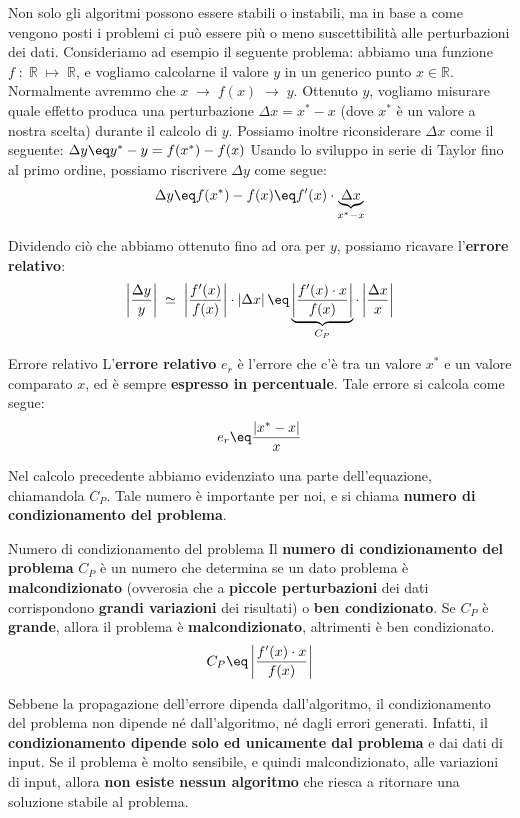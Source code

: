 Non solo gli algoritmi possono essere stabili o instabili, ma in base a come vengono posti i problemi ci può essere più o meno suscettibilità alle perturbazioni dei dati. Consideriamo ad esempio il seguente problema: abbiamo una funzione $f \; : \; \mathbb{R} \; \mapsto \; \mathbb{R}$, e vogliamo calcolarne il valore $y$ in un generico punto $x \in \mathbb{R}$. Normalmente avremmo che $x \; \rightarrow \; f(x) \; \rightarrow \; y$.
\nl
Ottenuto $y$, vogliamo misurare quale effetto produca una perturbazione $\Delta x = x^* - x$ (dove $x^*$ è un valore a nostra scelta) durante il calcolo di $y$. Possiamo inoltre riconsiderare $\Delta x$ come il seguente: $\Delta y \eq y^* - y = f(x^*) - f(x)$
\nl
Usando lo sviluppo in serie di Taylor fino al primo ordine, possiamo riscrivere $\Delta y$ come segue:
\[ \Delta y \eq f(x^*) - f(x) \eq f'(x) \cdot \underbrace{\Delta x}_{x^* - x} \]

Dividendo ciò che abbiamo ottenuto fino ad ora per $y$, possiamo ricavare l'\textbf{errore relativo}:
\[ \left| \frac{\Delta y}{y} \right| \; \simeq \; \left| \frac{f'(x)}{f(x)} \right| \cdot \left|\Delta x\right| \eq \underbrace{\left| \frac{f'(x) \cdot x}{f(x)} \right|}_{C_P} \cdot \left|\frac{\Delta x}{x}\right| \]

\begin{definition}{Errore relativo}
    L'\textbf{errore relativo} $e_r$ è l'errore che c'è tra un valore $x^*$ e un valore comparato $x$, ed è sempre \textbf{espresso in percentuale}. Tale errore si calcola come segue:
    \[ e_r \eq \frac{\left| x^* - x \right|}{x} \]
\end{definition}

Nel calcolo precedente abbiamo evidenziato una parte dell'equazione, chiamandola $C_P$. Tale numero è importante per noi, e si chiama \textbf{numero di condizionamento del problema}.

\begin{definition}{Numero di condizionamento del problema}
    Il \textbf{numero di condizionamento del problema} $C_P$ è un numero che determina se un dato problema è \textbf{malcondizionato} (ovverosia che a \textbf{piccole perturbazioni} dei dati corrispondono \textbf{grandi variazioni} dei risultati) o \textbf{ben condizionato}. Se $C_P$ è \textbf{grande}, allora il problema è \textbf{malcondizionato}, altrimenti è ben condizionato.
    \[ C_P \eq \left| \frac{f'(x) \cdot x}{f(x)} \right| \]
\end{definition}

Sebbene la propagazione dell'errore dipenda dall'algoritmo, il condizionamento del problema non dipende né dall'algoritmo, né dagli errori generati. Infatti, il \textbf{condizionamento dipende solo ed unicamente dal problema} e dai dati di input. Se il problema è molto sensibile, e quindi malcondizionato, alle variazioni di input, allora \textbf{non esiste nessun algoritmo} che riesca a ritornare una soluzione stabile al problema.